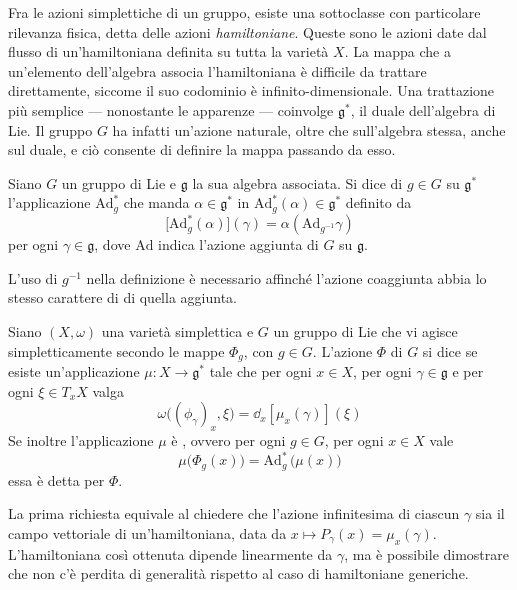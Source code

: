 Fra le azioni simplettiche di un gruppo, esiste una sottoclasse con particolare rilevanza fisica, detta delle azioni \emph{hamiltoniane}. Queste sono le azioni date dal flusso di un'hamiltoniana definita su tutta la varietà $X$. La mappa che a un'elemento dell'algebra associa l'hamiltoniana è difficile da trattare direttamente, siccome il suo codominio è infinito-dimensionale. Una trattazione più semplice --- nonostante le apparenze --- coinvolge $\mathfrak{g}^*$, il duale dell'algebra di Lie. Il gruppo $G$ ha infatti un'azione naturale, oltre che sull'algebra stessa, anche sul duale, e ciò consente di definire la mappa passando da esso.
\begin{definition}
  Siano $G$ un gruppo di Lie e $\mathfrak{g}$ la sua algebra associata. Si dice  di $g \in G$ su $\mathfrak{g}^*$ l'applicazione $\mathrm{Ad}_g^*$ che manda $\alpha \in \mathfrak{g}^*$ in $\mathrm{Ad}^*_g(\alpha) \in \mathfrak{g}^*$ definito da
  \begin{equation*}
  \big[\mathrm{Ad}^*_g(\alpha)\big](\gamma) = \alpha(\mathrm{Ad}_{g^{-1}}\gamma)
  \end{equation*}
  per ogni $\gamma \in \mathfrak{g}$, dove $\mathrm{Ad}$ indica l'azione aggiunta di $G$ su $\mathfrak{g}$.
\end{definition}
\begin{remark}
  L'uso di $g^{-1}$ nella definizione è necessario affinché l'azione coaggiunta abbia lo stesso carattere di  di quella aggiunta.
\end{remark}
\begin{definition}
  Siano $(X, \omega)$ una varietà simplettica e $G$ un gruppo di Lie che vi agisce simpletticamente secondo le mappe $\Phi_g$, con $g \in G$. L'azione $\Phi$ di $G$ si dice  se esiste un'applicazione $\mu: X \to \mathfrak{g}^*$ tale che per ogni $x \in X$, per ogni $\gamma \in \mathfrak{g}$ e per ogni $\xi \in T_x X$ valga
  \begin{equation*}
  \omega\big((\phi_{\gamma})_x, \xi\big) = \dd_x [\mu_x(\gamma)](\xi)
  \end{equation*} 
  Se inoltre l'applicazione $\mu$ è , ovvero per ogni $g \in G$, per ogni $x \in X$ vale
  \begin{equation*}
  \mu\big(\Phi_g(x)\big) = \mathrm{Ad}_g^*\, \big(\mu(x)\big)
  \end{equation*} 
  essa è detta  per $\Phi$.
\end{definition}
\begin{remark}
  La prima richiesta equivale al chiedere che l'azione infinitesima di ciascun $\gamma$ sia il campo vettoriale di un'hamiltoniana, data da $x \mapsto P_{\gamma}(x) = \mu_x(\gamma)$. L'hamiltoniana così ottenuta dipende linearmente da $\gamma$, ma è possibile dimostrare che non c'è perdita di generalità rispetto al caso di hamiltoniane generiche.
\end{remark}
